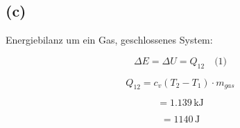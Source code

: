 

\subsection*{(c)}

Energiebilanz um ein Gas, geschlossenes System:

\[
\Delta E = \Delta U = Q_{12} \quad \text{(1)}
\]

\[
Q_{12} = c_v (T_2 - T_1) \cdot m_{gas}
\]

\[
= 1.139 \, \text{kJ}
\]

\[
= 1140 \, \text{J}
\]